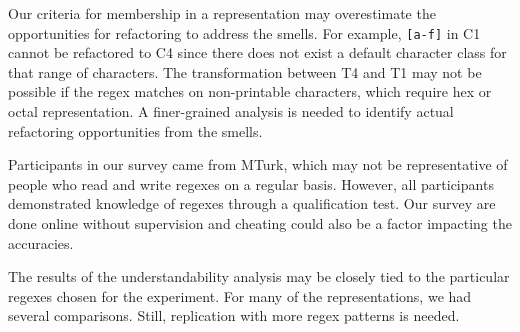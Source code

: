 
Our criteria for membership in a representation may overestimate the opportunities for refactoring to address the smells. For example, \verb![a-f]! in C1 cannot be refactored to C4 since there does not exist a default character class for that range of characters. The transformation between T4 and T1 may not be possible if the regex matches on non-printable characters, which require hex or octal representation. A finer-grained analysis is needed to identify actual refactoring opportunities from the smells.

Participants in our survey came from MTurk, which may not be representative of people who read and write regexes on a regular basis. However, all participants demonstrated knowledge of regexes through a qualification test. Our survey are done online without supervision and cheating could also be a factor impacting the accuracies.


The results of the understandability analysis may be closely tied to the particular regexes chosen for the experiment. For many of the representations, we had several comparisons. Still, replication with more regex patterns is needed.%




